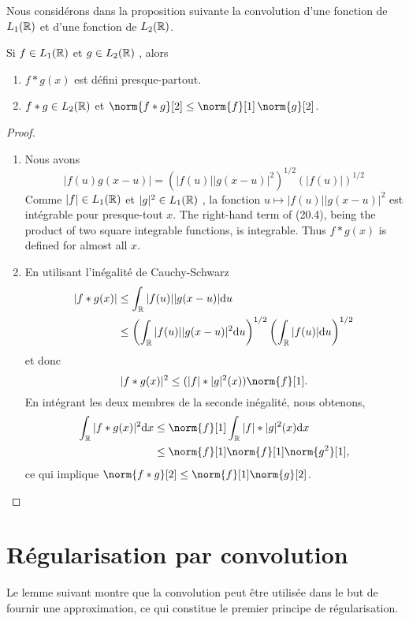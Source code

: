 Nous consid\'erons dans la proposition suivante la convolution d'une fonction de $L_1(\mathbb{R})$
 et d'une fonction de $L_{2}(\mathbb{R})$.
\begin{proposition}
Si $f\in L_1(\mathbb{R})$ et $g\in L_{2}(\mathbb{R})$ , alors
\begin{enumerate}[label=(\roman*)]
\item $f*g(x)$ est d\'efini presque-partout.
\item  $f*g  \in L_{2}(\mathbb{R})$  et $\norm{f*g}[2]\leq \norm{f}[1] \, \norm{g}[2]$.
\end{enumerate}
\end{proposition}
\begin{proof}
\begin{enumerate}[label=(\roman*), wide=0pt, labelindent=\parindent]
\item Nous avons
\begin{equation}
|f(u)g(x-u)|=(|f(u)||g(x-u)|^{2})^{1/2}(|f(u)|)^{1/2}
\end{equation}
Comme $|f|\in L_1(\mathbb{R})$ et $|g|^{2}\in L_1(\mathbb{R})$ , la fonction $u\mapsto|f(u)||g(x-u)|^{2}$ est int\'egrable pour presque-tout
$x$. The right-hand term of (20.4), being the product of two square integrable functions, is integrable. Thus $f*g(x)$ is defined for almost all $x.$

\item En utilisant l'in\'egalit\'e de Cauchy-Schwarz
\begin{align*}
|f*g(x)| &\leq\int_{\mathbb{R}}|f(u)||g(x-u)|\mathrm{d} u \\
&\leq \left(\int_{\mathbb{R}}|f(u)||g(x-u)|^{2}\mathrm{d} u \right)^{1/2} \left(\int_{\mathbb{R}}|f(u)|\mathrm{d} u \right)^{1/2}
\end{align*}
et donc
$$
|f*g(x)|^{2}\leq(|f|*|g|^{2}(x))\norm{f}[1].
$$
En int\'egrant les deux membres de la seconde in\'egalit\'e, nous obtenons,
\begin{align*}
\int_{\rset}|f*g(x)|^{2}\rmd x &\leq \norm{f}[1] \int_{\rset}|f|*|g|^{2}(x)\rmd x \\
&\leq\norm{f}[1] \norm{f}[1] \norm{g^{2}}[1],
\end{align*}
ce qui implique $\norm{f*g}[2] \leq \norm{f}[1] \norm{g}[2]$.
\end{enumerate}
\end{proof}
\section{R\'egularisation par convolution}
Le lemme suivant montre que la convolution peut {\^e}tre utilis{\'e}e dans le but de
fournir une approximation, ce qui constitue le premier principe de
r{\'e}gularisation.


